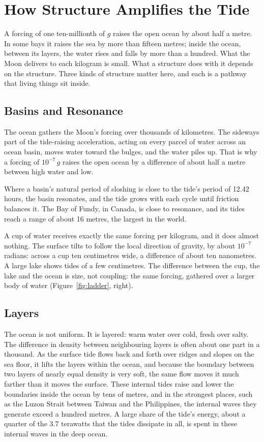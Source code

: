 \documentclass[11pt,a4paper]{article}
\begin{document}
\section{How Structure Amplifies the Tide}
\label{sec:amplify}

A forcing of one ten-millionth of $g$ raises the open ocean by about half a metre. In some bays it raises the sea by more than fifteen metres; inside the ocean, between its layers, the water rises and falls by more than a hundred. What the Moon delivers to each kilogram is small. What a structure does with it depends on the structure. Three kinds of structure matter here, and each is a pathway that living things sit inside.

\subsection*{Basins and Resonance}

The ocean gathers the Moon's forcing over thousands of kilometres. The sideways part of the tide-raising acceleration, acting on every parcel of water across an ocean basin, moves water toward the bulges, and the water piles up. That is why a forcing of $10^{-7}\,g$ raises the open ocean by a difference of about half a metre between high water and low.

Where a basin's natural period of sloshing is close to the tide's period of 12.42 hours, the basin resonates, and the tide grows with each cycle until friction balances it. The Bay of Fundy, in Canada, is close to resonance, and its tides reach a range of about 16 metres, the largest in the world.

A cup of water receives exactly the same forcing per kilogram, and it does almost nothing. The surface tilts to follow the local direction of gravity, by about $10^{-7}$ radians: across a cup ten centimetres wide, a difference of about ten nanometres. A large lake shows tides of a few centimetres. The difference between the cup, the lake and the ocean is size, not coupling: the same forcing, gathered over a larger body of water (Figure~\ref{fig:ladder}, right).

\subsection*{Layers}

The ocean is not uniform. It is layered: warm water over cold, fresh over salty. The difference in density between neighbouring layers is often about one part in a thousand. As the surface tide flows back and forth over ridges and slopes on the sea floor, it lifts the layers within the ocean, and because the boundary between two layers of nearly equal density is very soft, the same flow moves it much farther than it moves the surface. These internal tides raise and lower the boundaries inside the ocean by tens of metres, and in the strongest places, such as the Luzon Strait between Taiwan and the Philippines, the internal waves they generate exceed a hundred metres. A large share of the tide's energy, about a quarter of the 3.7 terawatts that the tides dissipate in all, is spent in these internal waves in the deep ocean.
\end{document}
